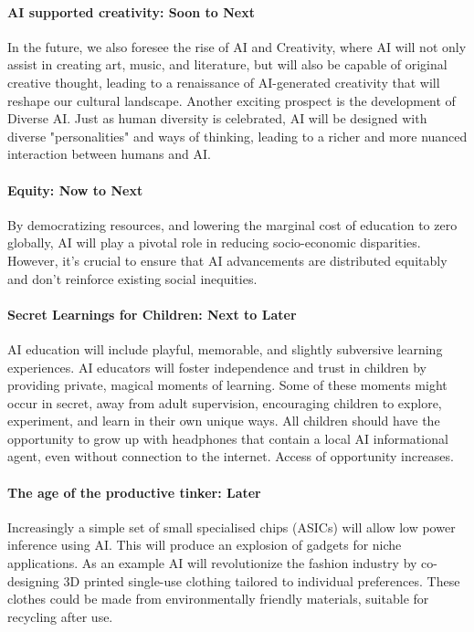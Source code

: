 \paragraph{AI supported creativity: Soon to Next}\par
In the future, we also foresee the rise of AI and Creativity, where AI will not only assist in creating art, music, and literature, but will also be capable of original creative thought, leading to a renaissance of AI-generated creativity that will reshape our cultural landscape. Another exciting prospect is the development of Diverse AI. Just as human diversity is celebrated, AI will be designed with diverse "personalities" and ways of thinking, leading to a richer and more nuanced interaction between humans and AI.

\paragraph{Equity: Now to Next}\par
By democratizing resources, and lowering the marginal cost of education to zero globally, AI will play a pivotal role in reducing socio-economic disparities. However, it's crucial to ensure that AI advancements are distributed equitably and don't reinforce existing social inequities.
\paragraph{Secret Learnings for Children: Next to Later} \par
AI education will include playful, memorable, and slightly subversive learning experiences. AI educators will foster independence and trust in children by providing private, magical moments of learning. Some of these moments might occur in secret, away from adult supervision, encouraging children to explore, experiment, and learn in their own unique ways. All children should have the opportunity to grow up with headphones that contain a local AI informational agent, even without connection to the internet. Access of opportunity increases.
\paragraph{The age of the productive tinker: Later}\par
Increasingly a simple set of small specialised chips (ASICs) will allow low power inference using AI. This will produce an explosion of gadgets for niche applications. As an example AI will revolutionize the fashion industry by co-designing 3D printed single-use clothing tailored to individual preferences. These clothes could be made from environmentally friendly materials, suitable for recycling after use.
